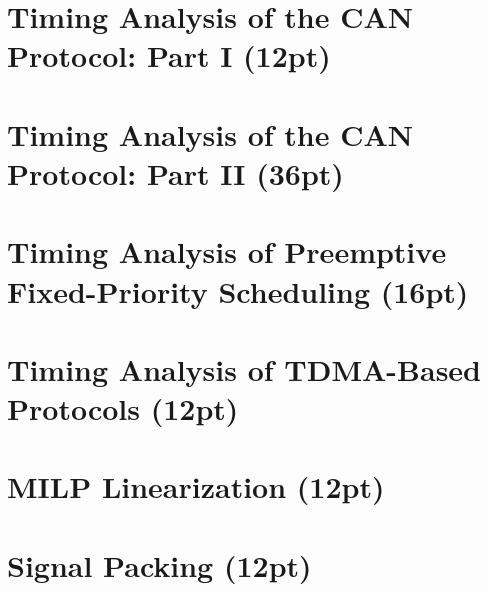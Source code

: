\documentclass{article}
\title{\mytitle}
\author{\textbf{\myauthor}}
\date{}
\begin{document}
\maketitle

\section{Timing Analysis of the CAN Protocol: Part I (12pt)}

\section{Timing Analysis of the CAN Protocol: Part II (36pt)}
\section{Timing Analysis of Preemptive Fixed-Priority Scheduling (16pt)}
\section{Timing Analysis of TDMA-Based Protocols (12pt)}
\section{MILP Linearization (12pt)}
\section{Signal Packing (12pt)}
\end{document}
